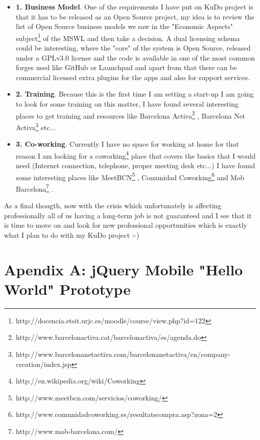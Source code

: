 \documentclass[a4paper,12pt]{book}
\begin{document}
\begin{itemize}
 \item \textbf{1. Business Model}. One of the requirements I have put on KuDo project is that it has to be  released as an Open Source project, my idea is to review the list of Open Source business models we saw in the "Economic Aspects" subject\footnote{http://docencia.etsit.urjc.es/moodle/course/view.php?id=122}  of the MSWL and then take a decision. A dual licensing schema could be interesting, where the "core" of the system is Open Source, released under a GPLv3.0 license and the code is available in one of the most common forges used like GitHub or Launchpad and apart from that there can be commercial licensed extra plugins for the apps and also for support services.
 \item \textbf{2. Training}. Because this is the first time I am setting a start-up I am going to look for some training on this matter, I have found several interesting places to get training and resources like Barcelona Activa\footnote{http://www.barcelonactiva.cat/barcelonactiva/es/agenda.do} , Barcelona Net Activa\footnote{http://www.barcelonanetactiva.com/barcelonanetactiva/en/company-creation/index.jsp} etc...
 \item \textbf{3. Co-working}. Currently I have no space for working at home for that reason I am looking for a coworking\footnote{http://en.wikipedia.org/wiki/Coworking} place that covers the basics that I would need (Internet connection, telephone, proper meeting desk etc...) I have found some interesting places like MeetBCN\footnote{http://www.meetbcn.com/servicios/coworking/} , Comunidad Coworking\footnote{http://www.comunidadcoworking.es/resultatscompra.asp?zona=2}  and Mob Barcelona\footnote{http://www.mob-barcelona.com/} .
\end{itemize}

As a final thougth, now with the crisis which unfortunately is affecting professionally all of us having a long-term job is not guaranteed and I see that it is time to move on and look for new professional opportunities which is exactly what I plan to do with my KuDo project :-)


\chapter{Apendix A: jQuery Mobile "Hello World" Prototype}
\label{Apendix A: jQuery Mobile "Hello World" Prototype}
\end{document}
